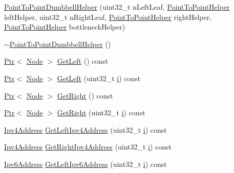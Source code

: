 \begin{DoxyCompactItemize}
\item 
\hyperlink{classns3_1_1PointToPointDumbbellHelper_a0ef17ad7a35cf814ba949ea91ab38279}{Point\+To\+Point\+Dumbbell\+Helper} (uint32\+\_\+t n\+Left\+Leaf, \hyperlink{classns3_1_1PointToPointHelper}{Point\+To\+Point\+Helper} left\+Helper, uint32\+\_\+t n\+Right\+Leaf, \hyperlink{classns3_1_1PointToPointHelper}{Point\+To\+Point\+Helper} right\+Helper, \hyperlink{classns3_1_1PointToPointHelper}{Point\+To\+Point\+Helper} bottleneck\+Helper)
\item 
\hyperlink{classns3_1_1PointToPointDumbbellHelper_a914f2863f59c739bc9bb3bcde587661b}{$\sim$\+Point\+To\+Point\+Dumbbell\+Helper} ()
\item 
\hyperlink{classns3_1_1Ptr}{Ptr}$<$ \hyperlink{classns3_1_1Node}{Node} $>$ \hyperlink{classns3_1_1PointToPointDumbbellHelper_a8933bfa2a6f97c2be38a4808e5fa9ec4}{Get\+Left} () const 
\item 
\hyperlink{classns3_1_1Ptr}{Ptr}$<$ \hyperlink{classns3_1_1Node}{Node} $>$ \hyperlink{classns3_1_1PointToPointDumbbellHelper_a859aa2cc2e20fa6ee81ee827e4579439}{Get\+Left} (uint32\+\_\+t \hyperlink{lte__uplink__power__control_8m_a6f6ccfcf58b31cb6412107d9d5281426}{i}) const 
\item 
\hyperlink{classns3_1_1Ptr}{Ptr}$<$ \hyperlink{classns3_1_1Node}{Node} $>$ \hyperlink{classns3_1_1PointToPointDumbbellHelper_aa68edfbee375a687aa1dd98a9a6c238b}{Get\+Right} () const 
\item 
\hyperlink{classns3_1_1Ptr}{Ptr}$<$ \hyperlink{classns3_1_1Node}{Node} $>$ \hyperlink{classns3_1_1PointToPointDumbbellHelper_ae9c3f10ca24ac9c94f1f78f3ea76eac7}{Get\+Right} (uint32\+\_\+t \hyperlink{lte__uplink__power__control_8m_a6f6ccfcf58b31cb6412107d9d5281426}{i}) const 
\item 
\hyperlink{classns3_1_1Ipv4Address}{Ipv4\+Address} \hyperlink{classns3_1_1PointToPointDumbbellHelper_a014b85767e4a2522d1471ecb275c10ea}{Get\+Left\+Ipv4\+Address} (uint32\+\_\+t \hyperlink{lte__uplink__power__control_8m_a6f6ccfcf58b31cb6412107d9d5281426}{i}) const 
\item 
\hyperlink{classns3_1_1Ipv4Address}{Ipv4\+Address} \hyperlink{classns3_1_1PointToPointDumbbellHelper_a44a6a66c29124090b6cb538649bd640b}{Get\+Right\+Ipv4\+Address} (uint32\+\_\+t \hyperlink{lte__uplink__power__control_8m_a6f6ccfcf58b31cb6412107d9d5281426}{i}) const 
\item 
\hyperlink{classns3_1_1Ipv6Address}{Ipv6\+Address} \hyperlink{classns3_1_1PointToPointDumbbellHelper_a37c3f16d7e6061ebd5cae06614ab9ea4}{Get\+Left\+Ipv6\+Address} (uint32\+\_\+t \hyperlink{lte__uplink__power__control_8m_a6f6ccfcf58b31cb6412107d9d5281426}{i}) const 

\end{DoxyCompactItemize}
